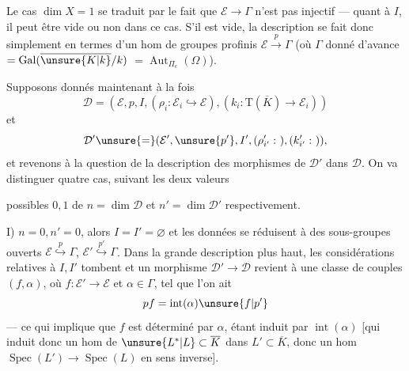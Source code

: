 Le cas $\dim X=1$ se traduit par le fait que $\mathcal E\longrightarrow\Gamma$ n'est pas injectif --- quant à $I$, il peut être vide ou non dans ce cas.
S'il est vide, la description se fait donc simplement en termes d'un hom de groupes profinis $\mathcal E\xrightarrow{p}\Gamma$ (où $\Gamma$ donné d'avance $=\operatorname{Gal}(\overline{\unsure{K|k}}/k)$ \unsure{\}} $=\operatorname{Aut}_{\Pi_e}(\Omega)$).

Supposons donnés maintenant à la fois
\[
\mathcal D=(\mathcal E,p,I,(\rho_i:\mathcal E_i\hookrightarrow\mathcal E),(k_i:\mathrm T(\overline K)\longrightarrow\mathcal E_i))
\]
et
\[
\mathcal D'\unsure{=} (\mathcal E',\unsure{p'},I',(\rho'_{i'}:\ ),(k'_{i'}:\ )),
\]
et revenons à la question de la description des morphismes de $\mathcal D'$ dans $\mathcal D$.
On va distinguer quatre cas, suivant les deux valeurs

possibles $0,1$ de $n=\dim\mathcal D$ et $n'=\dim\mathcal D'$ respectivement.

I) $n=0,n'=0$, alors $I=I'=\varnothing$ et les données se réduisent à des sous-groupes ouverts
$\mathcal E\overset{p}{\hookrightarrow}\Gamma$, $\mathcal E'\overset{p'}{\hookrightarrow}\Gamma$.
Dans la grande description plus haut,  les considérations relatives à $I,I'$ tombent et un morphisme $\mathcal D'\longrightarrow\mathcal D$ revient à une classe de  couples $(f,\alpha)$, où
$f:\mathcal E'\longrightarrow\mathcal E$ et $\alpha\in\Gamma$, tel que l'on ait
\[
pf=\operatorname{int}(\alpha)\unsure{f|p'}
\]
--- ce qui implique que $f$ est déterminé par $\alpha$, étant induit par $\operatorname{int}(\alpha)$
[qui induit donc un hom de $\unsure{L^*|L}\subset\overline K$ dans $L'\subset\overline K$, donc un hom $\operatorname{Spec}(L')\longrightarrow\operatorname{Spec}(L)$ en sens inverse].

